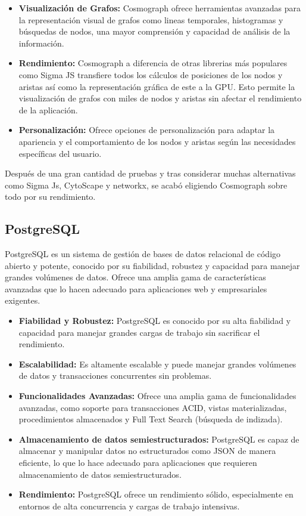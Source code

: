 \begin{itemize}
\item \textbf{Visualización de Grafos:} Cosmograph ofrece herramientas avanzadas para la representación visual de grafos como lineas temporales, histogramas y búsquedas de nodos, una mayor comprensión y capacidad de análisis de la información.

\item \textbf{Rendimiento:} Cosmograph a diferencia de otras librerias más populares como Sigma JS transfiere todos los cálculos de posiciones de los nodos y aristas así como la representación gráfica de este a la GPU. Esto permite la visualización de grafos con miles de nodos y aristas sin afectar el rendimiento de la aplicación.

\item \textbf{Personalización:} Ofrece opciones de personalización para adaptar la apariencia y el comportamiento de los nodos y aristas según las necesidades específicas del usuario.

\end{itemize}

Después de una gran cantidad de pruebas y tras considerar muchas alternativas como Sigma Js, CytoScape y networkx, se acabó eligiendo Cosmograph sobre todo por su rendimiento.

\subsection{PostgreSQL}

PostgreSQL es un sistema de gestión de bases de datos relacional de código abierto y potente, conocido por su fiabilidad, robustez y capacidad para manejar grandes volúmenes de datos. Ofrece una amplia gama de características avanzadas que lo hacen adecuado para aplicaciones web y empresariales exigentes.

\begin{itemize}
\item \textbf{Fiabilidad y Robustez:} PostgreSQL es conocido por su alta fiabilidad y capacidad para manejar grandes cargas de trabajo sin sacrificar el rendimiento.
\item \textbf{Escalabilidad:} Es altamente escalable y puede manejar grandes volúmenes de datos y transacciones concurrentes sin problemas.
\item \textbf{Funcionalidades Avanzadas:} Ofrece una amplia gama de funcionalidades avanzadas, como soporte para transacciones ACID, vistas materializadas, procedimientos almacenados y Full Text Search (búsqueda de indizada).
\item \textbf{Almacenamiento de datos semiestructurados:} PostgreSQL es capaz de almacenar y manipular datos no estructurados como JSON de manera eficiente, lo que lo hace adecuado para aplicaciones que requieren almacenamiento de datos semiestructurados.
\item \textbf{Rendimiento:} PostgreSQL ofrece un rendimiento sólido, especialmente en entornos de alta concurrencia y cargas de trabajo intensivas.
\end{itemize}

